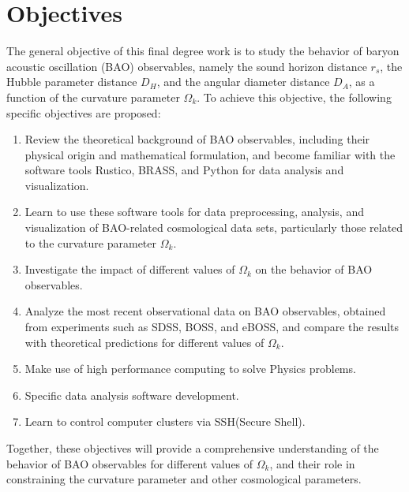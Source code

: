 \chapter{Objectives}
\label{cha:objectives}
The general objective of this final degree work is to study the behavior of baryon acoustic oscillation (BAO) observables, namely the sound horizon distance $r_s$, the Hubble parameter distance $D_H$, and the angular diameter distance $D_A$, as a function of the curvature parameter $\Omega_k$. To achieve this objective, the following specific objectives are proposed:

\begin{enumerate}
  \item Review the theoretical background of BAO observables, including their physical origin and mathematical formulation, and become familiar with the software tools Rustico, BRASS, and Python for data analysis and visualization.
  \item Learn to use these software tools for data preprocessing, analysis, and visualization of BAO-related cosmological data sets, particularly those related to the curvature parameter $\Omega_k$.
  \item Investigate the impact of different values of $\Omega_k$ on the behavior of BAO observables.
  \item Analyze the most recent observational data on BAO observables, obtained from experiments such as SDSS, BOSS, and eBOSS, and compare the results with theoretical predictions for different values of $\Omega_k$.
	\item Make use of high performance computing to solve Physics problems.
  \item Specific data analysis software development.
  \item Learn to control computer clusters via SSH(Secure Shell).
\end{enumerate}
Together, these objectives will provide a comprehensive understanding of the behavior of BAO observables for different values of $\Omega_k$, and their role in constraining the curvature parameter and other cosmological parameters.




